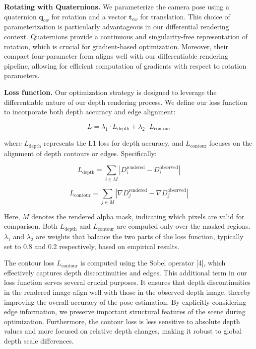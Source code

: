 \documentclass[twocolumn]{article} %
\begin{document}
\textbf{Rotating with Quaternions.} We parameterize the camera pose
using a quaternion \(\mathbf{q}_{cw}\) for rotation and a vector
\(\mathbf{t}_{cw}\) for translation. This choice of parameterization is
particularly advantageous in our differential rendering context.
Quaternions provide a continuous and singularity-free representation of
rotation, which is crucial for gradient-based optimization. Moreover,
their compact four-parameter form aligns well with our differentiable
rendering pipeline, allowing for efficient computation of gradients with
respect to rotation parameters.

\textbf{Loss function.} Our optimization strategy is designed to
leverage the differentiable nature of our depth rendering process. We
define our loss function to incorporate both depth accuracy and edge
alignment:

\[ 
L = \lambda_1 \cdot L_{\text{depth}} + \lambda_2 \cdot L_{\text{contour}} 
\]

where \(L_{\text{depth}}\) represents the L1 loss for depth accuracy,
and \(L_{\text{contour}}\) focuses on the alignment of depth contours or
edges. Specifically:

\[
L_{\text{depth}} = \sum_{i \in M} |D_i^{\text{rendered}} - D_i^{\text{observed}}|
\]

\[
L_{\text{contour}} = \sum_{j \in M} |\nabla D_j^{\text{rendered}} - \nabla D_j^{\text{observed}}|
\]

Here, \(M\) denotes the rendered alpha mask, indicating which pixels are
valid for comparison. Both \(L_{\text{depth}}\) and
\(L_{\text{contour}}\) are computed only over the masked regions.
\(\lambda_1\) and \(\lambda_2\) are weights that balance the two parts
of the loss function, typically set to 0.8 and 0.2 respectively, based
on empirical results.

The contour loss \(L_{\text{contour}}\) is computed using the Sobel
operator {[}4{]}, which effectively captures depth discontinuities and
edges. This additional term in our loss function serves several crucial
purposes. It ensures that depth discontinuities in the rendered image
align well with those in the observed depth image, thereby improving the
overall accuracy of the pose estimation. By explicitly considering edge
information, we preserve important structural features of the scene
during optimization. Furthermore, the contour loss is less sensitive to
absolute depth values and more focused on relative depth changes, making
it robust to global depth scale differences.
\end{document}
